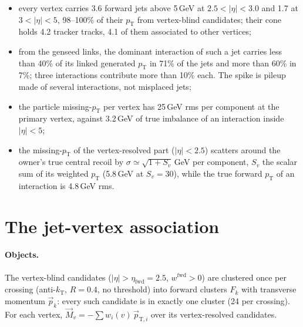 \documentclass[11pt,a4paper]{article}
\newcommand{\pt}{p_{\mathrm{T}}}
\begin{document}
\begin{itemize}
\item every vertex carries 3.6 forward jets above 5\,GeV at $2.5<|\eta|<3.0$
  and 1.7 at $3<|\eta|<5$, 98--100\% of their $\pt$ from vertex-blind
  candidates; their cone holds 4.2 tracker tracks, 4.1 of them associated to
  other vertices;
\item from the genseed links, the dominant interaction of such a jet carries
  less than 40\% of its linked generated $\pt$ in 71\% of the jets and more than
  60\% in 7\%; three interactions contribute more than 10\% each. The spike is
  pileup made of several interactions, not misplaced jets;
\item the particle missing-$\pt$ per vertex has 25\,GeV rms per component at the
  primary vertex, against 3.2\,GeV of true imbalance of an interaction inside
  $|\eta|<5$;
\item the missing-$\pt$ of the vertex-resolved part ($|\eta|<2.5$) scatters
  around the owner's true central recoil by $\sigma \simeq \sqrt{1 + S_v}$\,GeV
  per component, $S_v$ the scalar sum of its weighted $\pt$ (5.8\,GeV at
  $S_v = 30$), while the true forward $\pt$ of an interaction is 4.8\,GeV rms.
\end{itemize}

\section{The jet-vertex association}

\paragraph{Objects.} The vertex-blind candidates ($|\eta| > \eta_{\mathrm{fwd}} =
2.5$, $w^{\mathrm{fwd}}>0$) are clustered once per crossing (anti-$k_{\mathrm T}$,
$R=0.4$, no threshold) into forward clusters $F_k$ with transverse momentum
$\vec p_k$: every such candidate is in exactly one cluster (24 per crossing).
For each vertex, $\vec M_v = -\sum w_i(v)\,\vec p_{\mathrm{T},i}$ over its
vertex-resolved candidates.
\end{document}
